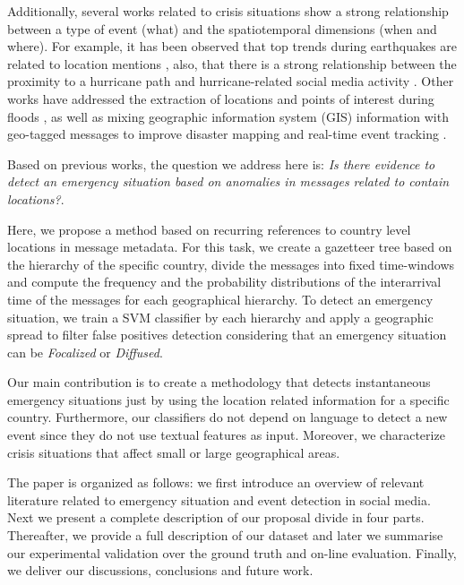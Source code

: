 \documentclass[sigconf]{acmart}
\begin{document}
Additionally, several works related to crisis situations show a strong relationship between a type of event (what) and the spatiotemporal dimensions (when and where). For example, it has been observed that top trends during earthquakes are related to location mentions \cite{mendoza2010twitter}, also, that there is a strong relationship between the proximity to a hurricane path and hurricane-related social media activity \cite{kryvasheyeu2016rapid}. Other works have addressed the extraction of locations and points of interest during floods \cite{lingad2013location}, as well as mixing geographic information system (GIS) information with geo-tagged messages to improve disaster mapping and real-time event tracking \cite{huang2015disastermapper}.

Based on previous works, the question we address here is: \textit{Is there evidence to detect an emergency situation based on anomalies in messages related to contain locations?}.

Here, we propose a method based on recurring references to country level locations in message metadata. For this task, we create a gazetteer tree based on the hierarchy of the specific country, divide the messages into fixed time-windows and compute the frequency and the probability distributions of the interarrival time of the messages for each geographical hierarchy. To detect an emergency situation, we train a SVM classifier by each hierarchy and apply a geographic spread to filter false positives detection considering that an emergency situation can be \textit{Focalized} or \textit{Diffused}.  

Our main contribution is to create a methodology that detects instantaneous emergency situations just by using the location related information for a specific country. Furthermore, our classifiers do not depend on language to detect a new event since they do not use textual features as input. Moreover, we characterize crisis situations that affect small or large geographical areas.

The paper is organized as follows: we first introduce an overview of relevant literature related to emergency situation and event detection in social media. Next we present a complete description of our proposal divide in four parts. Thereafter, we provide a full description of our dataset and later we summarise our experimental validation over the ground truth and on-line evaluation. Finally, we deliver our discussions, conclusions and future work.
\end{document}
